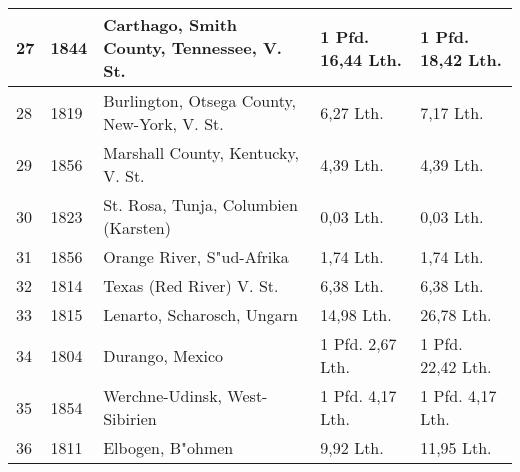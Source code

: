 \documentclass[a4paper, 11pt, oneside, german]{article}
\begin{document}
\begin{center}
\begin{footnotesize}
\begin{tabular}{ |p{7mm}|p{9mm}|p{45mm}|p{24mm}|p{24mm}| }
    27 & 1844 & Carthago, Smith County, Tennessee, V. St. & 1 Pfd. 16,44 Lth. & 1 Pfd. 18,42 Lth.\\\hline
    28 & 1819 & Burlington, Otsega County, New-York, V. St. & 6,27 Lth. & 7,17 Lth.\\\hline
    29 & 1856 & Marshall County, Kentucky, V. St. & 4,39 Lth. & 4,39 Lth.\\\hline
    30 & 1823 & St. Rosa, Tunja, Columbien (Karsten) & 0,03 Lth. & 0,03 Lth.\\\hline
    31 & 1856 & Orange River, S"ud-Afrika & 1,74 Lth. & 1,74 Lth.\\\hline
    32 & 1814 & Texas (Red River) V. St. & 6,38 Lth. & 6,38 Lth.\\\hline
    33 & 1815 & Lenarto, Scharosch, Ungarn & 14,98 Lth. & 26,78 Lth.\\\hline
    34 & 1804 & Durango, Mexico & 1 Pfd. 2,67 Lth. & 1 Pfd. 22,42 Lth.\\\hline
    35 & 1854 & Werchne-Udinsk, West-Sibirien & 1 Pfd. 4,17 Lth. & 1 Pfd. 4,17 Lth.\\\hline
    36 & 1811 & Elbogen, B"ohmen & 9,92 Lth. & 11,95 Lth.\\
    \hline
\end{tabular}
\end{footnotesize}
\end{center}
\end{document}
